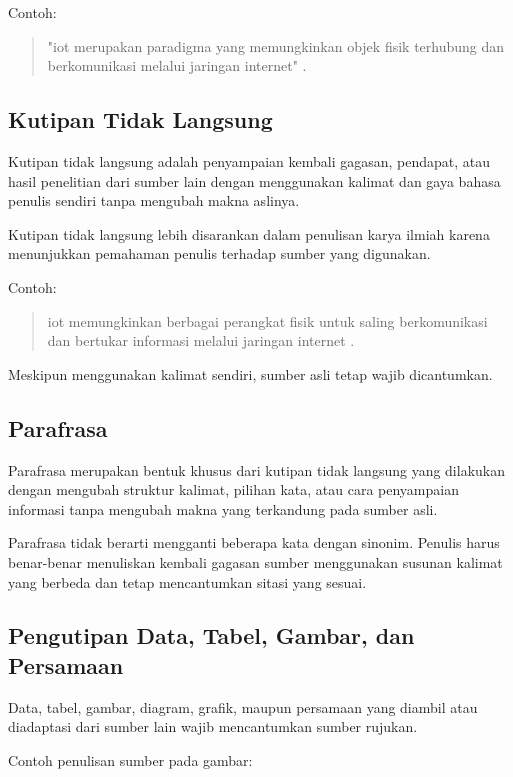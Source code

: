Contoh:

\begin{quote}
"\gls{iot} merupakan paradigma yang memungkinkan objek fisik terhubung dan berkomunikasi melalui jaringan internet" \cite{Atzori2010}.
\end{quote}

\subsection{Kutipan Tidak Langsung}

Kutipan tidak langsung adalah penyampaian kembali gagasan, pendapat, atau hasil penelitian dari sumber lain dengan menggunakan kalimat dan gaya bahasa penulis sendiri tanpa mengubah makna aslinya.

Kutipan tidak langsung lebih disarankan dalam penulisan karya ilmiah karena menunjukkan pemahaman penulis terhadap sumber yang digunakan.

Contoh:
\begin{quote}
\gls{iot} memungkinkan berbagai perangkat fisik untuk saling
berkomunikasi dan bertukar informasi melalui jaringan internet
\cite{Atzori2010}.
\end{quote}

Meskipun menggunakan kalimat sendiri, sumber asli tetap wajib dicantumkan.

\subsection{Parafrasa}

Parafrasa merupakan bentuk khusus dari kutipan tidak langsung yang dilakukan dengan mengubah struktur kalimat, pilihan kata, atau cara penyampaian informasi tanpa mengubah makna yang terkandung pada sumber asli.

Parafrasa tidak berarti mengganti beberapa kata dengan sinonim. Penulis harus benar-benar menuliskan kembali gagasan sumber menggunakan susunan kalimat yang berbeda dan tetap mencantumkan sitasi yang sesuai.

\subsection{Pengutipan Data, Tabel, Gambar, dan Persamaan}

Data, tabel, gambar, diagram, grafik, maupun persamaan yang diambil atau diadaptasi dari sumber lain wajib mencantumkan sumber rujukan.

Contoh penulisan sumber pada gambar:

